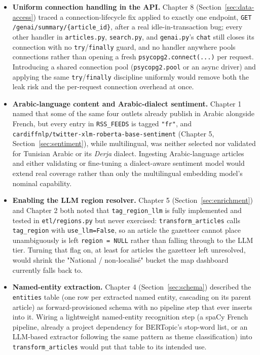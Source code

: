 \begin{sloppypar}
\begin{itemize}
    \item \textbf{Uniform connection handling in the API.} Chapter 8 (Section~\ref{sec:data-access}) traced a connection-lifecycle fix applied to exactly one endpoint, \texttt{GET /genai/\allowbreak summary/\allowbreak\{article\_id\}}, after a real idle-in-transaction bug; every other handler in \texttt{articles.py}, \texttt{search.py}, and \texttt{genai.py}'s \texttt{chat} still closes its connection with no \texttt{try}/\texttt{finally} guard, and no handler anywhere pools connections rather than opening a fresh \texttt{psycopg2.connect(...)} per request. Introducing a shared connection pool (\texttt{psycopg2.pool} or an async driver) and applying the same \texttt{try}/\texttt{finally} discipline uniformly would remove both the leak risk and the per-request connection overhead at once.
    \item \textbf{Arabic-language content and Arabic-dialect sentiment.} Chapter 1 named that some of the same four outlets already publish in Arabic alongside French, but every entry in \texttt{RSS\_FEEDS} is tagged \texttt{"fr"}, and \texttt{cardiffnlp/twitter-xlm-roberta-base-sentiment} (Chapter 5, Section~\ref{sec:sentiment}), while multilingual, was neither selected nor validated for Tunisian Arabic or its \textit{Derja} dialect. Ingesting Arabic-language articles and either validating or fine-tuning a dialect-aware sentiment model would extend real coverage rather than only the multilingual embedding model's nominal capability.
    \item \textbf{Enabling the LLM region resolver.} Chapter 5 (Section~\ref{sec:enrichment}) and Chapter 2 both noted that \texttt{tag\_region\_llm} is fully implemented and tested in \texttt{etl/regions.py} but never exercised: \texttt{transform\_articles} calls \texttt{tag\_region} with \texttt{use\_llm=False}, so an article the gazetteer cannot place unambiguously is left \texttt{region = NULL} rather than falling through to the LLM tier. Turning that flag on, at least for articles the gazetteer left unresolved, would shrink the "National / non-localisé" bucket the map dashboard currently falls back to.
    \item \textbf{Named-entity extraction.} Chapter 4 (Section~\ref{sec:schema}) described the \texttt{entities} table (one row per extracted named entity, cascading on its parent article) as forward-provisioned schema with no pipeline step that ever inserts into it. Wiring a lightweight named-entity recognition step (a spaCy French pipeline, already a project dependency for BERTopic's stop-word list, or an LLM-based extractor following the same pattern as theme classification) into \texttt{transform\_articles} would put that table to its intended use.

\end{itemize}
\end{sloppypar}
